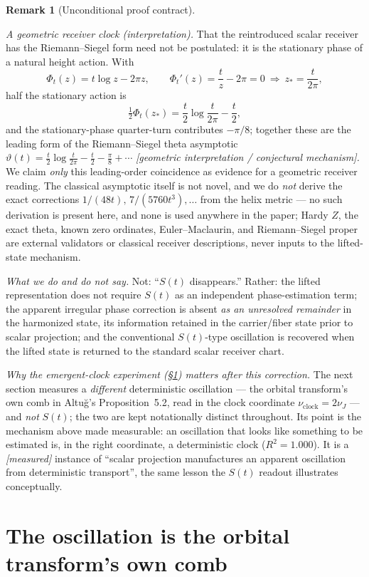 \documentclass[11pt]{article}
\newcommand{\bullshit}[1]{%
  \samwarning{MODEL-CONTAMINATION: #1}%
}
\theoremstyle{definition}
\newtheorem{remark}[theorem]{Remark}
\begin{document}
\begin{remark}[Unconditional proof contract]
\begin{enumerate}
\emph{A geometric receiver clock (interpretation).} That the reintroduced scalar receiver has the
Riemann--Siegel form need not be postulated: it is the stationary phase of a natural height action. With
\[
  \Phi_t(z)=t\log z-2\pi z,\qquad \Phi_t'(z)=\frac{t}{z}-2\pi=0\ \Rightarrow\ z_*=\frac{t}{2\pi},
\]
half the stationary action is
\[
  \tfrac12\Phi_t(z_*)=\frac t2\log\frac{t}{2\pi}-\frac t2,
\]
and the stationary-phase quarter-turn contributes $-\pi/8$; together these are the leading form of the
Riemann--Siegel theta asymptotic
$\vartheta(t)=\tfrac t2\log\tfrac{t}{2\pi}-\tfrac t2-\tfrac\pi8+\cdots$
\emph{[geometric interpretation / conjectural mechanism].} We claim \emph{only} this leading-order coincidence
as evidence for a geometric receiver reading. The classical asymptotic itself is not novel, and we do
\emph{not} derive the exact corrections $1/(48t),\,7/(5760t^3),\dots$ from the helix metric --- no such
derivation is present here, and none is used anywhere in the paper; Hardy $Z$, the exact theta, known zero
ordinates, Euler--Maclaurin, and Riemann--Siegel proper are external validators or classical receiver
descriptions, never inputs to the lifted-state mechanism.

\emph{What we do and do not say.} \bullshit{muddy water} Not: ``$S(t)$ disappears.'' Rather: the lifted representation does not
require $S(t)$ as an independent phase-estimation term; the apparent irregular phase correction is absent
\emph{as an unresolved remainder} in the harmonized state, its information retained in the carrier/fiber state
prior to scalar projection; and the conventional $S(t)$-type oscillation is recovered when the lifted state is
returned to the standard scalar receiver chart.

\emph{Why the emergent-clock experiment (\S\ref{sec:comb}) matters after this correction.} The next section
measures a \emph{different} deterministic oscillation --- the orbital transform's own comb in Altu\u{g}'s
Proposition~5.2, read in the clock coordinate $\nu_{\mathrm{clock}}=2\nu_J$ --- and \emph{not} $S(t)$; the two
are kept notationally distinct throughout. Its point is the mechanism above made measurable: an oscillation
that looks like something to be estimated is, in the right coordinate, a deterministic clock ($R^2=1.000$). It
is a \emph{[measured]} instance of ``scalar projection manufactures an apparent oscillation from deterministic
transport'', the same lesson the $S(t)$ readout illustrates conceptually.

\section{The oscillation is the orbital transform's own comb}\label{sec:comb}


\end{enumerate}
\end{remark}
\end{document}
